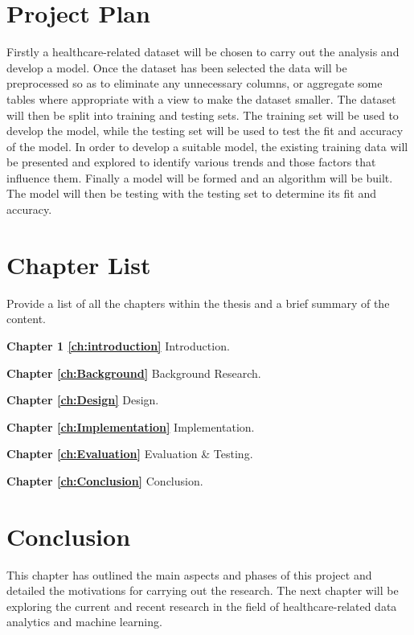\section{Project Plan}
Firstly a healthcare-related dataset will be chosen to carry out the analysis and develop a model. Once the dataset has been selected the data will be preprocessed so as to eliminate any unnecessary columns, or aggregate some tables where appropriate with a view to make the dataset smaller.
The dataset will then be split into training and testing sets. The training set will be used to develop the model, while the testing set will be used to test the fit and accuracy of the model.
In order to develop a suitable model, the existing training data will be presented and explored to identify various trends and those factors that influence them.
Finally a model will be formed and an algorithm will be built.
The model will then be testing with the testing set to determine its fit and accuracy.


\section{Chapter List}
Provide a list of all the chapters within the thesis and a brief summary of the content.

\textbf{Chapter 1 \ref{ch:introduction}} Introduction. 

\textbf{Chapter \ref{ch:Background}} Background Research. 

\textbf{Chapter \ref{ch:Design}} Design. 

\textbf{Chapter \ref{ch:Implementation}} Implementation. 

\textbf{Chapter \ref{ch:Evaluation}} Evaluation \& Testing. 

\textbf{Chapter \ref{ch:Conclusion}} Conclusion. 


\section{Conclusion}
This chapter has outlined the main aspects and phases of this project and detailed the motivations for carrying out the research. 
The next chapter will be exploring the current and recent research in the field of healthcare-related data analytics and machine learning.
